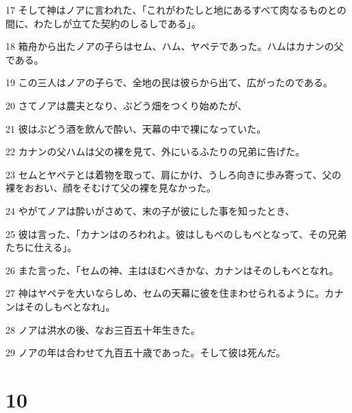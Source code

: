 \par 17 そして神はノアに言われた、「これがわたしと地にあるすべて肉なるものとの間に、わたしが立てた契約のしるしである」。
\par 18 箱舟から出たノアの子らはセム、ハム、ヤペテであった。ハムはカナンの父である。
\par 19 この三人はノアの子らで、全地の民は彼らから出て、広がったのである。
\par 20 さてノアは農夫となり、ぶどう畑をつくり始めたが、
\par 21 彼はぶどう酒を飲んで酔い、天幕の中で裸になっていた。
\par 22 カナンの父ハムは父の裸を見て、外にいるふたりの兄弟に告げた。
\par 23 セムとヤペテとは着物を取って、肩にかけ、うしろ向きに歩み寄って、父の裸をおおい、顔をそむけて父の裸を見なかった。
\par 24 やがてノアは酔いがさめて、末の子が彼にした事を知ったとき、
\par 25 彼は言った、「カナンはのろわれよ。彼はしもべのしもべとなって、その兄弟たちに仕える」。
\par 26 また言った、「セムの神、主はほむべきかな、カナンはそのしもべとなれ。
\par 27 神はヤペテを大いならしめ、セムの天幕に彼を住まわせられるように。カナンはそのしもべとなれ」。
\par 28 ノアは洪水の後、なお三百五十年生きた。
\par 29 ノアの年は合わせて九百五十歳であった。そして彼は死んだ。

\chapter{10}

